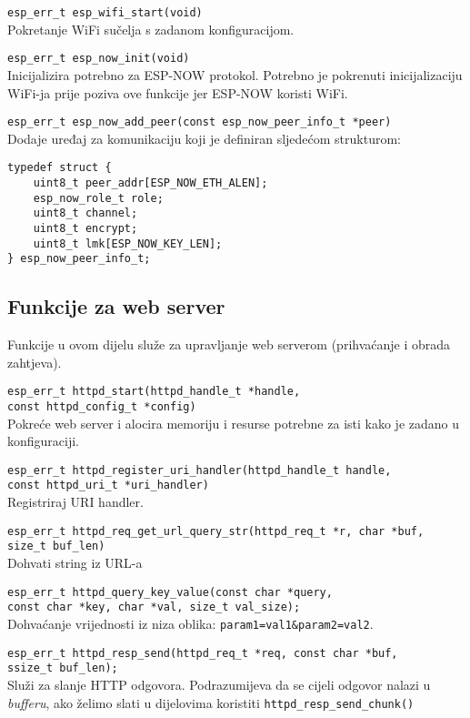 \documentclass[seminarskirad]{fer}
\begin{document}
\verb|esp_err_t esp_wifi_start(void)| \\
Pokretanje WiFi sučelja s zadanom konfiguracijom.
 
\verb|esp_err_t esp_now_init(void)| \\
Inicijalizira potrebno za ESP-NOW protokol. Potrebno je pokrenuti inicijalizaciju WiFi-ja prije poziva ove funkcije jer ESP-NOW koristi WiFi. 

\verb|esp_err_t esp_now_add_peer(const esp_now_peer_info_t *peer)| \\
Dodaje uređaj za komunikaciju koji je definiran sljedećom strukturom:

\begin{verbatim}
typedef struct {
    uint8_t peer_addr[ESP_NOW_ETH_ALEN]; 
    esp_now_role_t role;               
    uint8_t channel;                      
    uint8_t encrypt;                      
    uint8_t lmk[ESP_NOW_KEY_LEN];         
} esp_now_peer_info_t;
\end{verbatim}

\subsection{Funkcije za web server}

Funkcije u ovom dijelu služe za upravljanje web serverom (prihvaćanje i obrada zahtjeva).

\verb|esp_err_t httpd_start(httpd_handle_t *handle, |\\
\verb|const httpd_config_t *config)| \\
Pokreće web server i alocira memoriju i resurse potrebne za isti kako je zadano u konfiguraciji.

\verb|esp_err_t httpd_register_uri_handler(httpd_handle_t handle, | \\
\verb|const httpd_uri_t *uri_handler)| \\
Registriraj URI handler.

\verb|esp_err_t httpd_req_get_url_query_str(httpd_req_t *r, char *buf, | \\
\verb|size_t buf_len)| \\
Dohvati string iz URL-a

\verb|esp_err_t httpd_query_key_value(const char *query, | \\
\verb|const char *key, char *val, size_t val_size);| \\
Dohvaćanje vrijednosti iz niza oblika: \verb|param1=val1&param2=val2|.

\verb|esp_err_t httpd_resp_send(httpd_req_t *req, const char *buf, | \\
\verb|ssize_t buf_len);| \\
Služi za slanje HTTP odgovora. Podrazumijeva da se cijeli odgovor nalazi u \textit{bufferu}, ako želimo slati u dijelovima koristiti \verb|httpd_resp_send_chunk()|
\end{document}
